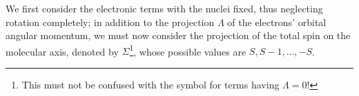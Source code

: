 We first consider the electronic terms with the nuclei fixed, thus neglecting rotation completely; in addition to the projection $\Lambda$
of the electrons' orbital angular momentum, we must now consider the projection of the total spin on the molecular axis, denoted by $\Sigma$\footnote{This must not be confused with the symbol for terms having $\Lambda=0$!}, whose possible values are $S,S-1,\ldots,-S$.

